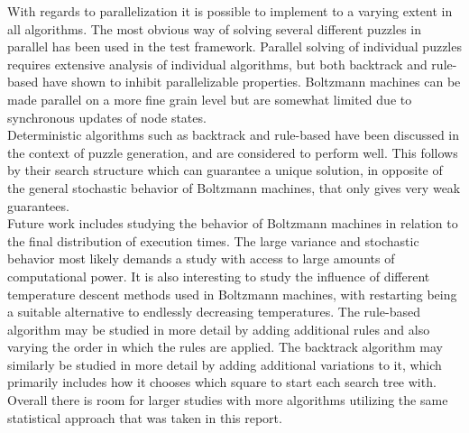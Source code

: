 \documentclass[a4paper,11pt]{kth-mag}
\begin{document}
With regards to parallelization it is possible to implement to a varying extent in all algorithms.
The most obvious way of solving several different puzzles in parallel has been used in the test framework.
Parallel solving of individual puzzles requires extensive analysis of individual algorithms, but both backtrack and rule-based have shown to inhibit parallelizable properties.
Boltzmann machines can be made parallel on a more fine grain level but are somewhat limited due to synchronous updates of node states.\\

Deterministic algorithms such as backtrack and rule-based have been discussed in the context of puzzle generation, and are considered to perform well.
This follows by their search structure which can guarantee a unique solution, in opposite of the general stochastic behavior of Boltzmann machines, that only gives very weak guarantees.\\

Future work includes studying the behavior of Boltzmann machines in relation to the final distribution of execution times.
The large variance and stochastic behavior most likely demands a study with access to large amounts of computational power.
It is also interesting to study the influence of different temperature descent methods used in Boltzmann machines, with restarting being a suitable alternative to endlessly decreasing temperatures.
The rule-based algorithm may be studied in more detail by adding additional rules and also varying the order in which the rules are applied.
The backtrack algorithm may similarly be studied in more detail by adding additional variations to it, which primarily includes how it chooses which square to start each search tree with.
Overall there is room for larger studies with more algorithms utilizing the same statistical approach that was taken in this report.
\end{document}
